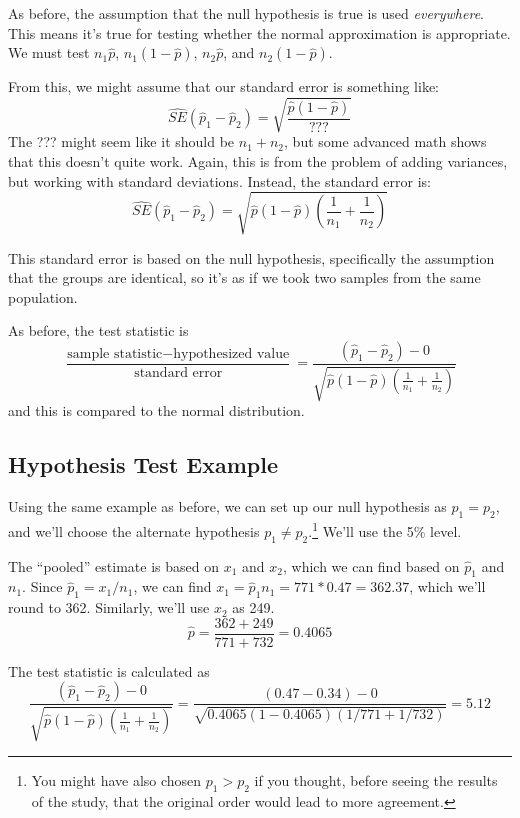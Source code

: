 \documentclass[
  letterpaper,
  DIV=11,
  numbers=noendperiod,
  oneside]{scrreprt}
\begin{document}
As before, the assumption that the null hypothesis is true is used
\emph{everywhere}. This means it's true for testing whether the normal
approximation is appropriate. We must test \(n_1\hat p\),
\(n_1(1 - \hat p)\), \(n_2\hat p\), and \(n_2(1 - \hat p)\).

From this, we might assume that our standard error is something like: \[
\hat{SE}(\hat p_1 - \hat p_2) = \sqrt{\frac{\hat p(1 - \hat p)}{???}}
\] The ??? might seem like it should be \(n_1 + n_2\), but some advanced
math shows that this doesn't quite work. Again, this is from the problem
of adding variances, but working with standard deviations. Instead, the
standard error is: \[
\hat{SE}(\hat p_1 - \hat p_2) = \sqrt{\hat p(1 - \hat p)\left(\frac{1}{n_1} + \frac{1}{n_2}\right)}
\]

This standard error is based on the null hypothesis, specifically the
assumption that the groups are identical, so it's as if we took two
samples from the same population.

As before, the test statistic is \[
\frac{\text{sample statistic} - \text{hypothesized value}}{\text{standard error}} = \frac{(\hat p_1 - \hat p_2) - 0}{\sqrt{\hat p(1 - \hat p)\left(\frac{1}{n_1} + \frac{1}{n_2}\right)}}
\] and this is compared to the normal distribution.

\hypertarget{hypothesis-test-example-1}{%
\subsection{Hypothesis Test Example}\label{hypothesis-test-example-1}}

Using the same example as before, we can set up our null hypothesis as
\(p_1 = p_2\), and we'll choose the alternate hypothesis
\(p_1 \ne p_2\).\footnote{You might have also chosen \(p_1 > p_2\) if
  you thought, before seeing the results of the study, that the original
  order would lead to more agreement.} We'll use the 5\% level.

The ``pooled'' estimate is based on \(x_1\) and \(x_2\), which we can
find based on \(\hat p_1\) and \(n_1\). Since \(\hat p_1 = x_1/n_1\), we
can find \(x_1 = \hat p_1 n_1 = 771 * 0.47 = 362.37\), which we'll round
to 362. Similarly, we'll use \(x_2\) as 249. \[
\hat p = \frac{362 + 249}{771 + 732} = 0.4065
\]

The test statistic is calculated as \[
\frac{(\hat p_1 - \hat p_2) - 0}{\sqrt{\hat p(1 - \hat p)\left(\frac{1}{n_1} + \frac{1}{n_2}\right)}} = \frac{(0.47 - 0.34) - 0}{\sqrt{0.4065(1-0.4065)(1/771 + 1/732)}} = 5.12
\]
\end{document}
